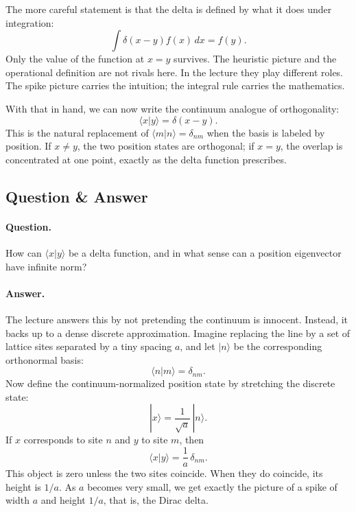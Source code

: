The more careful statement is that the delta is defined by what it does under integration:
\begin{equation}
\int \delta(x-y)f(x)\,dx=f(y).
\end{equation}
Only the value of the function at \(x=y\) survives. The heuristic picture and the operational definition are not rivals here. In the lecture they play different roles. The spike picture carries the intuition; the integral rule carries the mathematics.

With that in hand, we can now write the continuum analogue of orthogonality:
\begin{equation}
\langle x|y\rangle=\delta(x-y).
\end{equation}
This is the natural replacement of \(\langle m|n\rangle=\delta_{nm}\) when the basis is labeled by position. If \(x\neq y\), the two position states are orthogonal; if \(x=y\), the overlap is concentrated at one point, exactly as the delta function prescribes.

\subsection{Question \& Answer}

\paragraph{Question.} How can \(\langle x|y\rangle\) be a delta function, and in what sense can a position eigenvector have infinite norm?

\paragraph{Answer.} The lecture answers this by not pretending the continuum is innocent. Instead, it backs up to a dense discrete approximation. Imagine replacing the line by a set of lattice sites separated by a tiny spacing \(a\), and let \(|n\rangle\) be the corresponding orthonormal basis:
\[
\langle n|m\rangle=\delta_{nm}.
\]
Now define the continuum-normalized position state by stretching the discrete state:
\[
|x\rangle=\frac{1}{\sqrt a}\,|n\rangle.
\]
If \(x\) corresponds to site \(n\) and \(y\) to site \(m\), then
\begin{equation}
\langle x|y\rangle=\frac{1}{a}\,\delta_{nm}.
\end{equation}
This object is zero unless the two sites coincide. When they do coincide, its height is \(1/a\). As \(a\) becomes very small, we get exactly the picture of a spike of width \(a\) and height \(1/a\), that is, the Dirac delta.

